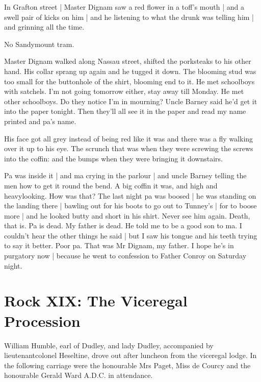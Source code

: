 In Grafton street |
Master Dignam saw a red flower in a toff's mouth |
and a swell pair of kicks on him |
and he listening to what the drunk was telling him |
and grinning all the time.

No Sandymount tram.

Master Dignam walked along Nassau street,
shifted the porksteaks to his other hand.
His collar sprang up again and he tugged it down.
The blooming stud was too small for the buttonhole of the shirt,
blooming end to it.
He met schoolboys with satchels.
I'm not going tomorrow either,
stay away till Monday.
He met other schoolboys.
Do they notice I'm in mourning?
Uncle Barney said he'd get it into the paper tonight.
Then they'll all see it in the paper
and read my name printed and pa's name.

His face got all grey
instead of being red like it was
and there was a
fly walking over it
up to his eye.
The scrunch that was
when they were
screwing the screws into the coffin:
and the bumps when they were bringing
it downstairs.

Pa was inside it |
and ma crying in the parlour |
and uncle Barney telling the men
how to get it round the bend.
A big coffin it was,
and high and heavylooking.
How was that?
The last night pa was boosed |
he was standing on the landing there |
bawling out for his boots to go out to Tunney's |
for to boose more |
and he looked butty and short in his shirt.
Never see him again.
Death, that is.
Pa is dead.
My father is dead.
He told me to be a good son to ma.
I couldn't hear the other things he said |
but I saw his tongue and his teeth trying to say it better.
Poor pa.
That was Mr Dignam, my father.
I hope he's in purgatory now |
because he went to confession to Father Conroy on Saturday night.


\section*{Rock XIX: The Viceregal Procession}


William Humble,
earl of Dudley,
and lady Dudley,
accompanied by
lieutenantcolonel Heseltine,
drove out after luncheon
from the viceregal
lodge.
In the following carriage
were the honourable Mrs Paget,
Miss de
Courcy
and the honourable Gerald Ward A.D.C.
in attendance.


